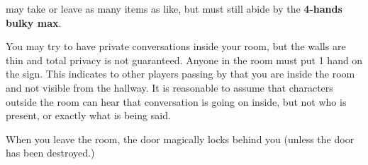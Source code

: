 {{\textbf{\cBunker{}} may take or leave as many items as \cBunker{\they} like\cBunker{\plural}, but must still abide by the \textbf{4-hands bulky max}.

You may try to have private conversations inside your room, but the walls are thin and total privacy is not guaranteed. Anyone in the room must put 1 hand on the sign. This indicates to other players passing by that you are inside the room and not visible from the hallway. It is reasonable to assume that characters outside the room can hear that conversation is going on inside, but not who is present, or  exactly what is being said.

When you leave the room, the door magically locks behind you (unless the door has been destroyed.)
	}
	\s{}
}



